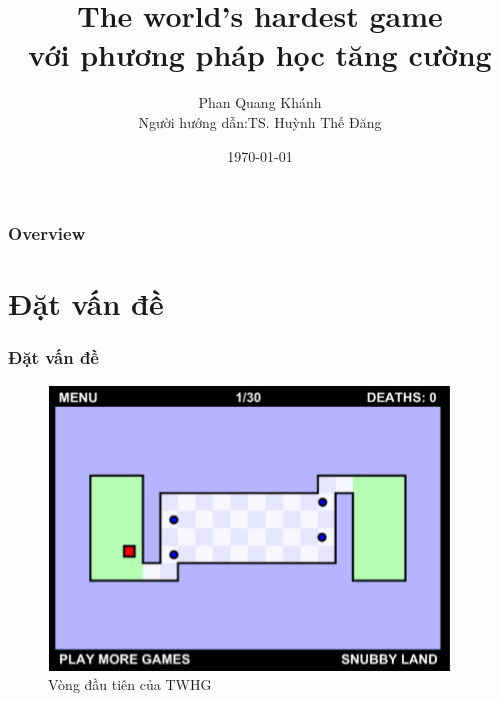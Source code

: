 \documentclass{beamer}
\title[]{The world's hardest game\\ 
với phương pháp học tăng cường}
\author{Phan Quang Khánh\\[0.5cm]{\small Người hướng dẫn:TS. Huỳnh Thế Đăng}} %
\institute[] %
{
Trường đại học Khoa học Tự nhiên \\ %
\medskip
\textit{1611125@student.hcmus.edu.vn} %
}
\date{\today} %
\begin{document}
\begin{frame}
\titlepage %
\end{frame}

\begin{frame}
\frametitle{Overview}
\tableofcontents 
\end{frame}

\section{Đặt vấn đề}

\begin{frame}
\frametitle{Đặt vấn đề}
\begin{figure}[h]
    \centering
    \includegraphics{photo/lv1game.png}
    \caption{Vòng đầu tiên của TWHG}
    \label{fig:my_label}
\end{figure}
\end{frame}
\end{document}
